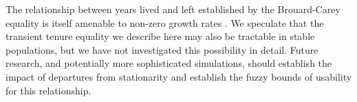 \documentclass[12pt,oneside,a4paper]{article}
\theoremstyle{definition}
\begin{document}
The relationship between years lived
and left established by the Brouard-Carey equality is itself amenable to non-zero growth rates \citep{riffe2015renewal}.
We speculate that the transient tenure equality we describe here may also be tractable in stable
populations, but we have not investigated this possibility in detail. Future
research, and potentially more sophisticated simulations, should establish the
impact of departures from stationarity and establish the fuzzy bounds of
usability for this relationship.



%

  
\end{document}
